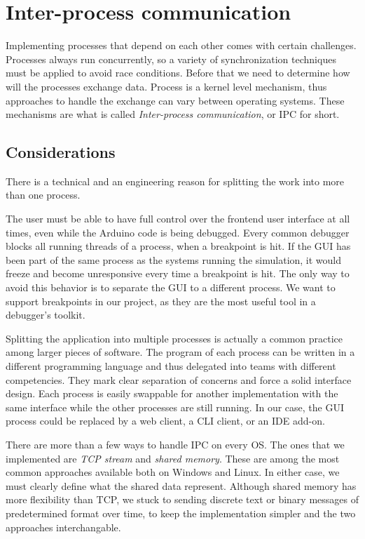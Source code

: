 \section{Inter-process communication}

Implementing processes that depend on each other comes with certain challenges. Processes always run concurrently, so a variety of synchronization techniques must be applied to avoid race conditions. Before that we need to determine how will the processes exchange data. Process is a kernel level mechanism, thus approaches to handle the exchange can vary between operating systems. These mechanisms are what is called \textit{Inter-process communication}, or IPC for short.

\subsection{Considerations}
There is a technical and an engineering reason for splitting the work into more than one process.

The user must be able to have full control over the frontend user interface at all times, even while the Arduino code is being debugged. Every common debugger blocks all running threads of a process, when a breakpoint is hit. If the GUI has been part of the same process as the systems running the simulation, it would freeze and become unresponsive every time a breakpoint is hit. The only way to avoid this behavior is to separate the GUI to a different process. We want to support breakpoints in our project, as they are the most useful tool in a debugger's toolkit.

Splitting the application into multiple processes is actually a common practice among larger pieces of software. The program of each process can be written in a different programming language and thus delegated into teams with different competencies. They mark clear separation of concerns and force a solid interface design. Each process is easily swappable for another implementation with the same interface while the other processes are still running. In our case, the GUI process could be replaced by a web client, a CLI client, or an IDE add-on.

There are more than a few ways to handle IPC on every OS. The ones that we implemented are \textit{TCP stream} and \textit{shared memory}. These are among the most common approaches available both on Windows and Linux. In either case, we must clearly define what the shared data represent. Although shared memory has more flexibility than TCP, we stuck to sending discrete text or binary messages of predetermined format over time, to keep the implementation simpler and the two approaches interchangable.

